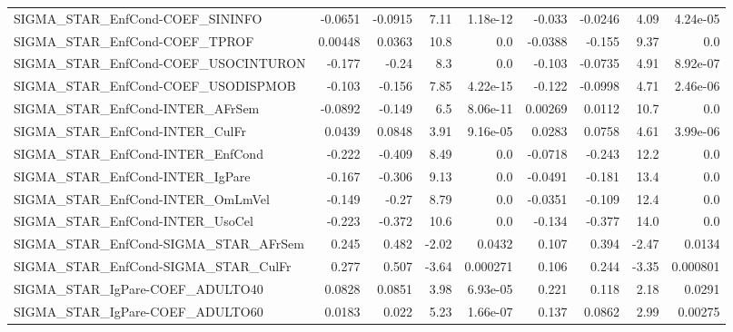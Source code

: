\begin{tabular}{lrrrrrrrr}
SIGMA\_STAR\_EnfCond-COEF\_SININFO       &     -0.0651 &      -0.0915 &    7.11 & 1.18e-12 &     -0.033 &     -0.0246 &         4.09 &      4.24e-05 \\
SIGMA\_STAR\_EnfCond-COEF\_TPROF         &     0.00448 &       0.0363 &    10.8 &      0.0 &    -0.0388 &      -0.155 &         9.37 &           0.0 \\
SIGMA\_STAR\_EnfCond-COEF\_USOCINTURON   &      -0.177 &        -0.24 &     8.3 &      0.0 &     -0.103 &     -0.0735 &         4.91 &      8.92e-07 \\
SIGMA\_STAR\_EnfCond-COEF\_USODISPMOB    &      -0.103 &       -0.156 &    7.85 & 4.22e-15 &     -0.122 &     -0.0998 &         4.71 &      2.46e-06 \\
SIGMA\_STAR\_EnfCond-INTER\_AFrSem       &     -0.0892 &       -0.149 &     6.5 & 8.06e-11 &    0.00269 &      0.0112 &         10.7 &           0.0 \\
SIGMA\_STAR\_EnfCond-INTER\_CulFr        &      0.0439 &       0.0848 &    3.91 & 9.16e-05 &     0.0283 &      0.0758 &         4.61 &      3.99e-06 \\
SIGMA\_STAR\_EnfCond-INTER\_EnfCond      &      -0.222 &       -0.409 &    8.49 &      0.0 &    -0.0718 &      -0.243 &         12.2 &           0.0 \\
SIGMA\_STAR\_EnfCond-INTER\_IgPare       &      -0.167 &       -0.306 &    9.13 &      0.0 &    -0.0491 &      -0.181 &         13.4 &           0.0 \\
SIGMA\_STAR\_EnfCond-INTER\_OmLmVel      &      -0.149 &        -0.27 &    8.79 &      0.0 &    -0.0351 &      -0.109 &         12.4 &           0.0 \\
SIGMA\_STAR\_EnfCond-INTER\_UsoCel       &      -0.223 &       -0.372 &    10.6 &      0.0 &     -0.134 &      -0.377 &         14.0 &           0.0 \\
SIGMA\_STAR\_EnfCond-SIGMA\_STAR\_AFrSem  &       0.245 &        0.482 &   -2.02 &   0.0432 &      0.107 &       0.394 &        -2.47 &        0.0134 \\
SIGMA\_STAR\_EnfCond-SIGMA\_STAR\_CulFr   &       0.277 &        0.507 &   -3.64 & 0.000271 &      0.106 &       0.244 &        -3.35 &      0.000801 \\
SIGMA\_STAR\_IgPare-COEF\_ADULTO40       &      0.0828 &       0.0851 &    3.98 & 6.93e-05 &      0.221 &       0.118 &         2.18 &        0.0291 \\
SIGMA\_STAR\_IgPare-COEF\_ADULTO60       &      0.0183 &        0.022 &    5.23 & 1.66e-07 &      0.137 &      0.0862 &         2.99 &       0.00275 \\

\end{tabular}
